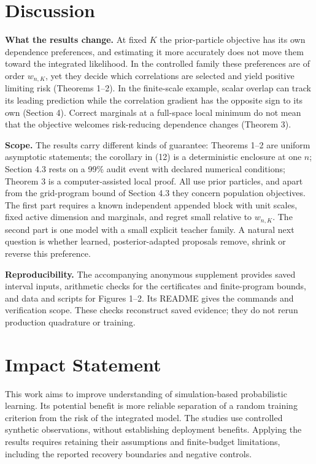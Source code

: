 \documentclass{article}
\begin{document}
\section{Discussion}\label{discussion}

\textbf{What the results change.} At fixed \(K\) the prior-particle
objective has its own dependence preferences, and estimating it more
accurately does not move them toward the integrated likelihood. In the
controlled family these preferences are of order \(w_{n,K}\), yet they
decide which correlations are selected and yield positive limiting risk
(Theorems 1--2). In the finite-scale example, scalar overlap can track
its leading prediction while the correlation gradient has the opposite
sign to its own (Section 4). Correct marginals at a full-space local
minimum do not mean that the objective welcomes risk-reducing dependence
changes (Theorem 3).

\textbf{Scope.} The results carry different kinds of guarantee: Theorems
1--2 are uniform asymptotic statements; the corollary in (12) is a
deterministic enclosure at one \(n\); Section 4.3 rests on a 99\% audit
event with declared numerical conditions; Theorem 3 is a
computer-assisted local proof. All use prior particles, and apart from
the grid-program bound of Section 4.3 they concern population
objectives. The first part requires a known independent appended block
with unit scales, fixed active dimension and marginals, and regret small
relative to \(w_{n,K}\). The second part is one model with a small
explicit teacher family. A natural next question is whether learned,
posterior-adapted proposals \citep{burda2016} remove, shrink or reverse
this preference.

\textbf{Reproducibility.} The accompanying anonymous supplement provides
saved interval inputs, arithmetic checks for the certificates and
finite-program bounds, and data and scripts for Figures 1--2. Its README
gives the commands and verification scope. These checks reconstruct
saved evidence; they do not rerun production quadrature or training.
\FloatBarrier
\label{candidateMainEnd}
\section*{Impact Statement}\label{impact-statement}

This work aims to improve understanding of simulation-based
probabilistic learning. Its potential benefit is more reliable
separation of a random training criterion from the risk of the
integrated model. The studies use controlled synthetic observations,
without establishing deployment benefits. Applying the results requires
retaining their assumptions and finite-budget limitations, including the
reported recovery boundaries and negative controls.


\clearpage
\onecolumn
\setcounter{secnumdepth}{0}
\setcounter{figure}{0}
\renewcommand{\thefigure}{S\arabic{figure}}
\end{document}
